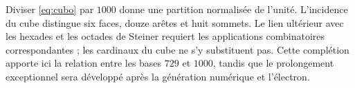 Diviser \eqref{eq:cubo} par \(1000\) donne une partition normalisée de l’unité. L’incidence du cube distingue six faces, douze arêtes et huit sommets. Le lien ultérieur avec les hexades et les octades de Steiner requiert les applications combinatoires correspondantes ; les cardinaux du cube ne s’y substituent pas. Cette complétion apporte ici la relation entre les bases \(729\) et \(1000\), tandis que le prolongement exceptionnel sera développé après la génération numérique et l’électron.





